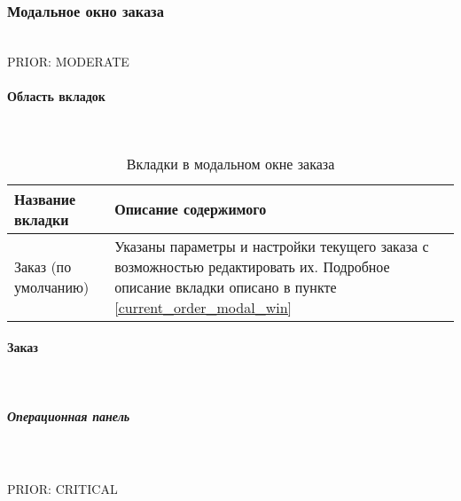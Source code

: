 		\subsubsection{Модальное окно заказа} \label{order_modal_win}

			\\
			PRIOR: MODERATE\\

			\paragraph{Область вкладок} \mbox{} \label{tab_place_order_madal_win}\\

				\begin{table} [h]
	               \begin{center}
	               \caption {Вкладки в модальном окне заказа}
	               \setlength{\extrarowheight}{2mm}
	               \begin{tabular}{|p{5cm}|p{10cm}|}
	                   \hline     \textbf{Название вкладки}&\textbf{Описание содержимого} \\ [2mm]

	                   \hline Заказ (по умолчанию) & Указаны параметры и настройки текущего заказа с возможностью редактировать их. Подробное описание вкладки описано в пункте \ref{current_order_modal_win}\\ [2mm]
	                   \hline
	               \end{tabular}
	               \end{center}
               \end{table}

            \paragraph{Заказ} \mbox{} \label{current_order_modal_win}\\
			 
            	\subparagraph{Операционная панель} \mbox{} \\

            		 \\
            		PRIOR: CRITICAL \\

